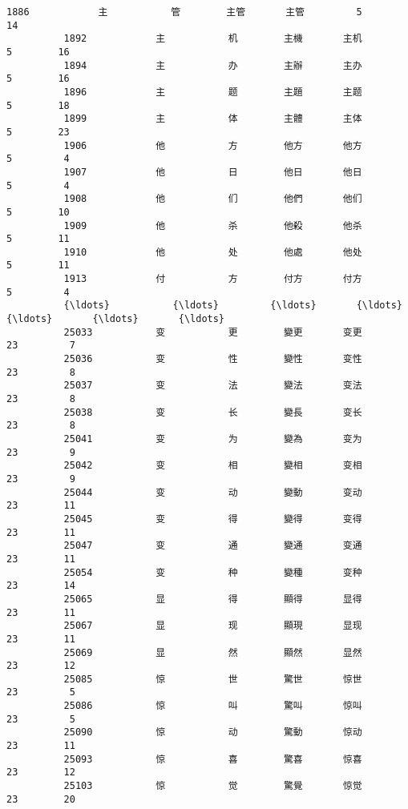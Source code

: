 \documentclass[11pt]{article}
\begin{document}
\begin{Verbatim}[commandchars=\\\{\}]
          1886            主           管        主管       主管         5        14   
          1892            主           机        主機       主机         5        16   
          1894            主           办        主辦       主办         5        16   
          1896            主           题        主題       主题         5        18   
          1899            主           体        主體       主体         5        23   
          1906            他           方        他方       他方         5         4   
          1907            他           日        他日       他日         5         4   
          1908            他           们        他們       他们         5        10   
          1909            他           杀        他殺       他杀         5        11   
          1910            他           处        他處       他处         5        11   
          1913            付           方        付方       付方         5         4   
          {\ldots}           {\ldots}         {\ldots}       {\ldots}      {\ldots}       {\ldots}       {\ldots}   
          25033           变           更        變更       变更        23         7   
          25036           变           性        變性       变性        23         8   
          25037           变           法        變法       变法        23         8   
          25038           变           长        變長       变长        23         8   
          25041           变           为        變為       变为        23         9   
          25042           变           相        變相       变相        23         9   
          25044           变           动        變動       变动        23        11   
          25045           变           得        變得       变得        23        11   
          25047           变           通        變通       变通        23        11   
          25054           变           种        變種       变种        23        14   
          25065           显           得        顯得       显得        23        11   
          25067           显           现        顯現       显现        23        11   
          25069           显           然        顯然       显然        23        12   
          25085           惊           世        驚世       惊世        23         5   
          25086           惊           叫        驚叫       惊叫        23         5   
          25090           惊           动        驚動       惊动        23        11   
          25093           惊           喜        驚喜       惊喜        23        12   
          25103           惊           觉        驚覺       惊觉        23        20   

\end{Verbatim}
\end{document}
